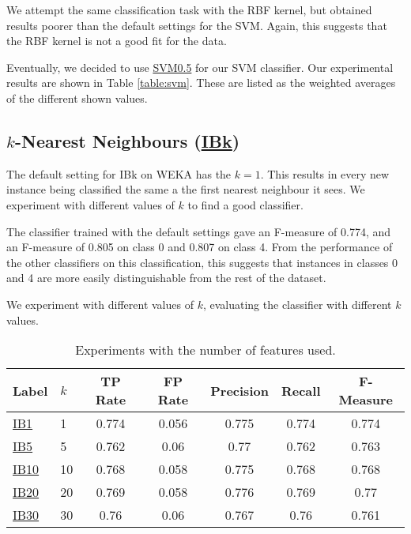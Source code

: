 \documentclass[12pt]{article}
\begin{document}
We attempt the same classification task with the RBF kernel, but obtained results poorer than the default settings for the SVM. Again, this suggests that the RBF kernel is not a good fit for the data.

Eventually, we decided to use \url{SVM0.5} for our SVM classifier. Our experimental results are shown in Table \ref{table:svm}. These are listed as the weighted averages of the different shown values.
\subsection{$k$-Nearest Neighbours (\url{IBk})}
The default setting for IBk on WEKA has the $k=1$. This results in every new instance being classified the same a the first nearest neighbour it sees. We experiment with different values of $k$ to find a good classifier.

The classifier trained with the default settings gave an F-measure of 0.774, and an F-measure of 0.805 on class 0 and 0.807 on class 4. From the performance of the other classifiers on this classification, this suggests that instances in classes 0 and 4 are more easily distinguishable from the rest of the dataset.

We experiment with different values of $k$, evaluating the classifier with different $k$ values.
\begin{table}[h]
\centering
\begin{tabular}{|l |l|c c c c c|}
\hline
Label & $k$ &	TP Rate & FP Rate & Precision & Recall  & F-Measure	 \\
\hline
\url{IB1}	& 1		&0.774    &  0.056   &    0.775  &    0.774   &   0.774	  \\
\url{IB5}	& 5 	&0.762    &  0.06    &    0.77   &    0.762   &   0.763	  \\   
\url{IB10}  & 10	&0.768    &  0.058   &    0.775  &    0.768   &   0.768	  \\
\url{IB20}	& 20	&0.769    &  0.058   &    0.776  &    0.769   &   0.77 	  \\
\url{IB30}	& 30	&0.76     &  0.06    &    0.767  &    0.76    &   0.761	  \\

\hline
\end{tabular}
\caption{Experiments with the number of features used.}
\label{table:knn}
\end{table}
\end{document}
